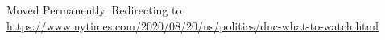 Moved Permanently. Redirecting to
\url{https://www.nytimes.com/2020/08/20/us/politics/dnc-what-to-watch.html}
